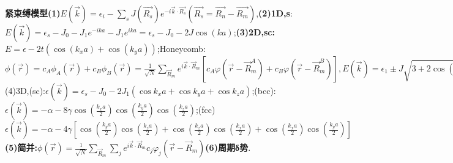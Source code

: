 \documentclass[UTF8,a4paper,10pt,twocolumn]{ctexart}
\begin{document}
  \textbf{紧束缚模型}\textbf{(1)}$E(\vec{k}) = \epsilon_{i} - \sum_{s}J(\vec{R_s})e^{-i\vec{k}\cdot\vec{R_s}}(\vec{R_s}=\vec{R_n}-\vec{R_m})$,\textbf{(2)1D,s}:$E(\vec{k}) = \epsilon_{s} - J_{0} - J_{1}e^{-ika} - J_{1}e^{ika}=\epsilon_{s} - J_{0} -  2J\cos(ka)$;\textbf{(3)2D,sc:}$E = \epsilon - 2t\left(\cos(k_{x}a) + \cos(k_{y}a)\right)$;Honeycomb:$\phi(\vec{r}) = c_{A}\phi_{A}(\vec{r}) + c_{B}\phi_{B}(\vec{r})= \frac{1}{\sqrt{N}}\sum_{\vec{R}_{m}}e^{i\vec{k}\cdot\vec{R}_{m}}\left[c_{A}\varphi(\vec{r}-\vec{R}_{m}^{A}) + c_{B}\varphi(\vec{r}-\vec{R}_{m}^{B})\right],E(\vec{k}) = \epsilon_{1}\pm J\sqrt{3+2\cos{(\sqrt{3}k_{y}a)}+4\cos{\left(\frac{\sqrt{3}k_{y}a}{2}\right)}\cos{\left(\frac{3k_{x}a}{2}\right)}}$(4)3D,(sc):$\epsilon(\vec{k}) = \epsilon_{s} - J_{0} - 2J_{1}(\cos{k_{x}a}+\cos{k_{y}a}+\cos{k_{z}a})$;(bcc):$\epsilon(\vec{k}) = -\alpha - 8\gamma\cos{\left(\frac{k_{x}a}{2}\right)}\cos{\left(\frac{k_{y}a}{2}\right)}\cos{\left(\frac{k_{z}a}{2}\right)}$;(fcc)$\epsilon(\vec{k}) = -\alpha - 4\gamma\left[\cos{\left(\frac{k_{y}a}{2}\right)}\cos{\left(\frac{k_{z}a}{2}\right)}+\cos{\left(\frac{k_{z}a}{2}\right)}\cos{\left(\frac{k_{x}a}{2}\right)}+\cos{\left(\frac{k_{x}a}{2}\right)}\cos{\left(\frac{k_{y}a}{2}\right)}\right]$
\textbf{(5)简并:}$\phi(\vec{r}) = \frac{1}{\sqrt{N}}\sum_{\vec{R}_{m}}\sum_{j}e^{i\vec{k}\cdot\vec{R}_{m}}c_{j}\varphi_{j}(\vec{r}-\vec{R}_{m})$\textbf{(6)周期δ势}.
   
\end{document}
